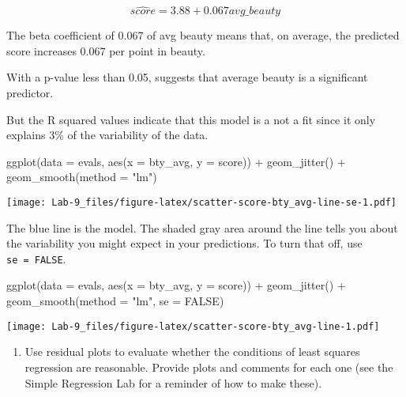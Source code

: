 \documentclass[
]{article}
\newenvironment{Shaded}{\begin{snugshade}}{\end{snugshade}}
\newcommand{\AttributeTok}[1]{\textcolor[rgb]{0.77,0.63,0.00}{#1}}
\newcommand{\ConstantTok}[1]{\textcolor[rgb]{0.00,0.00,0.00}{#1}}
\newcommand{\FunctionTok}[1]{\textcolor[rgb]{0.00,0.00,0.00}{#1}}
\newcommand{\NormalTok}[1]{#1}
\newcommand{\SpecialCharTok}[1]{\textcolor[rgb]{0.00,0.00,0.00}{#1}}
\newcommand{\StringTok}[1]{\textcolor[rgb]{0.31,0.60,0.02}{#1}}
\providecommand{\tightlist}{%
  \setlength{\itemsep}{0pt}\setlength{\parskip}{0pt}}
\begin{document}
\[
\widehat{score} = 3.88 + 0.067 avg\_beauty
\]

The beta coefficient of 0.067 of avg beauty means that, on average, the
predicted score increases 0.067 per point in beauty.

With a p-value less than 0.05, suggests that average beauty is a
significant predictor.

But the R squared values indicate that this model is a not a fit since
it only explains 3\% of the variability of the data.

\begin{Shaded}
\begin{Highlighting}[]
\FunctionTok{ggplot}\NormalTok{(}\AttributeTok{data =}\NormalTok{ evals, }\FunctionTok{aes}\NormalTok{(}\AttributeTok{x =}\NormalTok{ bty\_avg, }\AttributeTok{y =}\NormalTok{ score)) }\SpecialCharTok{+} \FunctionTok{geom\_jitter}\NormalTok{() }\SpecialCharTok{+} \FunctionTok{geom\_smooth}\NormalTok{(}\AttributeTok{method =} \StringTok{"lm"}\NormalTok{)}
\end{Highlighting}
\end{Shaded}

\texttt{[image: Lab-9\_files/figure-latex/scatter-score-bty\_avg-line-se-1.pdf]}

The blue line is the model. The shaded gray area around the line tells
you about the variability you might expect in your predictions. To turn
that off, use \texttt{se\ =\ FALSE}.

\begin{Shaded}
\begin{Highlighting}[]
\FunctionTok{ggplot}\NormalTok{(}\AttributeTok{data =}\NormalTok{ evals, }\FunctionTok{aes}\NormalTok{(}\AttributeTok{x =}\NormalTok{ bty\_avg, }\AttributeTok{y =}\NormalTok{ score)) }\SpecialCharTok{+} \FunctionTok{geom\_jitter}\NormalTok{() }\SpecialCharTok{+} \FunctionTok{geom\_smooth}\NormalTok{(}\AttributeTok{method =} \StringTok{"lm"}\NormalTok{,}
    \AttributeTok{se =} \ConstantTok{FALSE}\NormalTok{)}
\end{Highlighting}
\end{Shaded}

\texttt{[image: Lab-9\_files/figure-latex/scatter-score-bty\_avg-line-1.pdf]}

\begin{enumerate}
\def\labelenumi{\arabic{enumi}.}
\setcounter{enumi}{5}
\tightlist
\item
  Use residual plots to evaluate whether the conditions of least squares
  regression are reasonable. Provide plots and comments for each one
  (see the Simple Regression Lab for a reminder of how to make these).
\end{enumerate}
\end{document}

